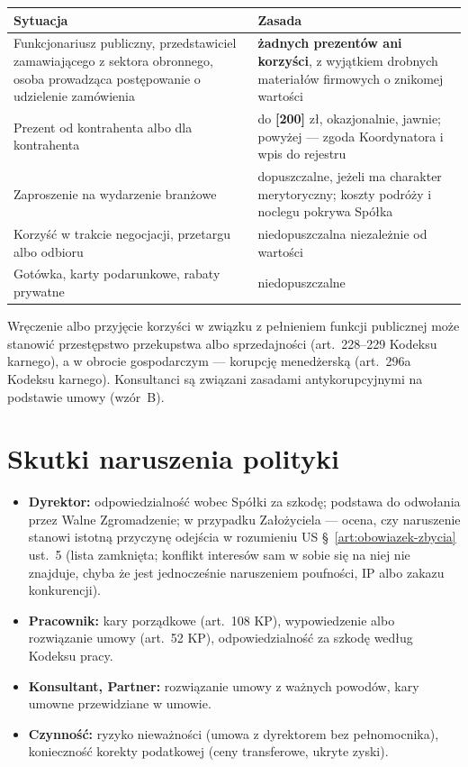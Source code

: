\documentclass[11pt,a4paper]{report}
\newcommand{\field}[1]{\textbf{[#1]}}
\newcommand{\US}[1]{US §~#1}
\begin{document}
\begin{center}
\small
\begin{tabularx}{\linewidth}{@{}>{\raggedright\arraybackslash}p{4.4cm} X@{}}
\toprule
\textbf{Sytuacja} & \textbf{Zasada} \\
\midrule
Funkcjonariusz publiczny, przedstawiciel zamawiającego z sektora obronnego, osoba prowadząca postępowanie o udzielenie zamówienia & \textbf{żadnych prezentów ani korzyści}, z wyjątkiem drobnych materiałów firmowych o znikomej wartości \\
Prezent od kontrahenta albo dla kontrahenta & do \field{200} zł, okazjonalnie, jawnie; powyżej --- zgoda Koordynatora i wpis do rejestru \\
Zaproszenie na wydarzenie branżowe & dopuszczalne, jeżeli ma charakter merytoryczny; koszty podróży i noclegu pokrywa Spółka \\
Korzyść w trakcie negocjacji, przetargu albo odbioru & niedopuszczalna niezależnie od wartości \\
Gotówka, karty podarunkowe, rabaty prywatne & niedopuszczalne \\
\bottomrule
\end{tabularx}
\end{center}

Wręczenie albo przyjęcie korzyści w związku z pełnieniem funkcji publicznej może stanowić przestępstwo przekupstwa albo sprzedajności (art.~228--229 Kodeksu karnego), a w obrocie gospodarczym --- korupcję menedżerską (art.~296a Kodeksu karnego). Konsultanci są związani zasadami antykorupcyjnymi na podstawie umowy (wzór~B).

\section{Skutki naruszenia polityki}

\begin{itemize}
  \item \textbf{Dyrektor:} odpowiedzialność wobec Spółki za szkodę; podstawa do odwołania przez Walne Zgromadzenie; w przypadku Założyciela --- ocena, czy naruszenie stanowi istotną przyczynę odejścia w rozumieniu \US{\ref{art:obowiazek-zbycia} ust.~5} (lista zamknięta; konflikt interesów sam w sobie się na niej nie znajduje, chyba że jest jednocześnie naruszeniem poufności, IP albo zakazu konkurencji).
  \item \textbf{Pracownik:} kary porządkowe (art.~108 KP), wypowiedzenie albo rozwiązanie umowy (art.~52 KP), odpowiedzialność za szkodę według Kodeksu pracy.
  \item \textbf{Konsultant, Partner:} rozwiązanie umowy z ważnych powodów, kary umowne przewidziane w umowie.
  \item \textbf{Czynność:} ryzyko nieważności (umowa z dyrektorem bez pełnomocnika), konieczność korekty podatkowej (ceny transferowe, ukryte zyski).
\end{itemize}
\end{document}

